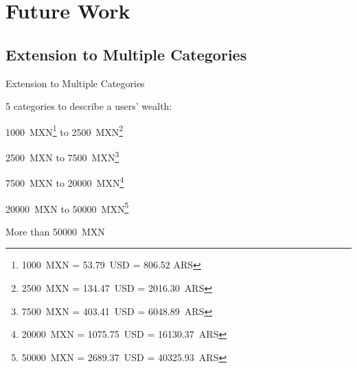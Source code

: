 \documentclass{beamer}
\begin{document}
\section{Future Work}
\subsection{Extension to Multiple Categories}

\begin{frame}{Extension to Multiple Categories}

5 categories to describe a users' wealth:

\begin{description}[leftmargin=!]
	\item[\(R_1\)] \num{1000}~MXN\footnote{\num{1000}~MXN = \num{53.79}~USD = \num{806.52} ARS} to \num{2500}~MXN\footnote{\num{2500}~MXN = \num{134.47}~USD = \num{2016.30}~ARS}
	\item[\(R_2\)] \num{2500}~MXN to \num{7500}~MXN\footnote{\num{7500}~MXN = \num{403.41}~USD = \num{6048.89}~ARS}
	\item[\(R_3\)] \num{7500}~MXN to \num{20000}~MXN\footnote{\num{20000}~MXN = \num{1075.75}~USD = \num{16130.37}~ARS}
	\item[\(R_4\)] \num{20000}~MXN to \num{50000}~MXN\footnote{\num{50000}~MXN = \num{2689.37}~USD = \num{40325.93}~ARS}
	\item[\(R_5\)] More than \num{50000}~MXN
\end{description}

\end{frame}
\end{document}

